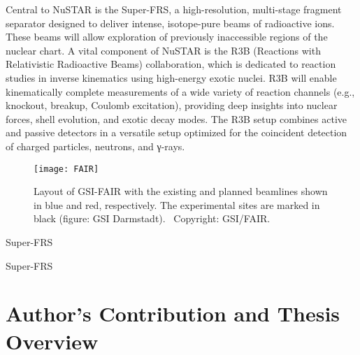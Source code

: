 \begin{itemize}
	Central to NuSTAR is the Super-FRS, a high-resolution, multi-stage fragment separator designed to deliver intense, isotope-pure beams of radioactive ions. These beams will allow exploration of previously inaccessible regions of the nuclear chart. A vital component of NuSTAR is the R3B (Reactions with Relativistic Radioactive Beams) collaboration, which is dedicated to reaction studies in inverse kinematics using high-energy exotic nuclei. R3B will enable kinematically complete measurements of a wide variety of reaction channels (e.g., knockout, breakup, Coulomb excitation), providing deep insights into nuclear forces, shell evolution, and exotic decay modes. The R3B setup combines active and passive detectors in a versatile setup optimized for the coincident detection of charged particles, neutrons, and γ-rays.
\end{itemize}



\begin{figure}
	\centering
	\texttt{[image: FAIR]}
	\caption{Layout of GSI-FAIR with the existing and planned beamlines shown in blue and red, respectively. The experimental sites are marked in black (figure: GSI Darmstadt). \textcopyright ~Copyright: GSI/FAIR.}
	\label{fig:R3BSetup}
\end{figure}


\gls{Super-FRS}

\gls{Super-FRS}

\section{Author's Contribution and Thesis Overview}
